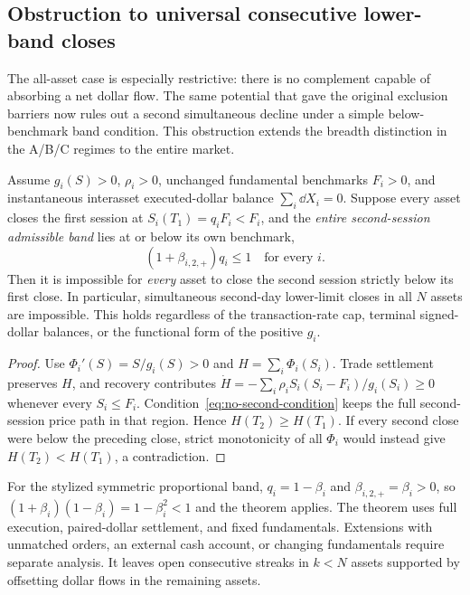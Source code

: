 \documentclass[review,hidelinks,onefignum,onetabnum]{siamonline250211}
\begin{document}
\subsection{Obstruction to universal consecutive lower-band closes}\label{subsec:multiday-full}
The all-asset case is especially restrictive: there is no complement capable of absorbing a net dollar flow. The same potential that gave the original exclusion barriers now rules out a second simultaneous decline under a simple below-benchmark band condition. This obstruction extends the breadth distinction in the A/B/C regimes to the entire market.
\begin{theorem}\label{thm:no-second-global}
Assume $g_i(S)>0$, $\rho_i>0$, unchanged fundamental benchmarks $F_i>0$, and instantaneous interasset executed-dollar balance $\sum_i\dd X_i=0$. Suppose every asset closes the first session at $S_i(T_1)=q_iF_i<F_i$, and the \emph{entire second-session admissible band} lies at or below its own benchmark,
\begin{equation}\label{eq:no-second-condition}
 (1+\beta_{i,2,+})q_i\le1\quad\text{for every }i.
\end{equation}
Then it is impossible for \emph{every} asset to close the second session strictly below its first close. In particular, simultaneous second-day lower-limit closes in all $N$ assets are impossible. This holds regardless of the transaction-rate cap, terminal signed-dollar balances, or the functional form of the positive $g_i$.
\end{theorem}
\begin{proof}
Use $\Phi_i'(S)=S/g_i(S)>0$ and $H=\sum_i\Phi_i(S_i)$. Trade settlement preserves $H$, and recovery contributes
$\dot H=-\sum_i\rho_i S_i(S_i-F_i)/g_i(S_i)\ge0$ whenever every $S_i\le F_i$.
Condition~\eqref{eq:no-second-condition} keeps the full second-session price path in that region. Hence $H(T_2)\ge H(T_1)$. If every second close were below the preceding close, strict monotonicity of all $\Phi_i$ would instead give $H(T_2)<H(T_1)$, a contradiction.
\end{proof}

For the stylized symmetric proportional band, $q_i=1-\beta_i$ and
$\beta_{i,2,+}=\beta_i>0$, so
$(1+\beta_i)(1-\beta_i)=1-\beta_i^2<1$ and the theorem applies. The theorem uses full execution, paired-dollar settlement, and fixed fundamentals. Extensions with unmatched orders, an external cash account, or changing fundamentals require separate analysis. It leaves open consecutive streaks in $k<N$ assets supported by offsetting dollar flows in the remaining assets.
\end{document}
